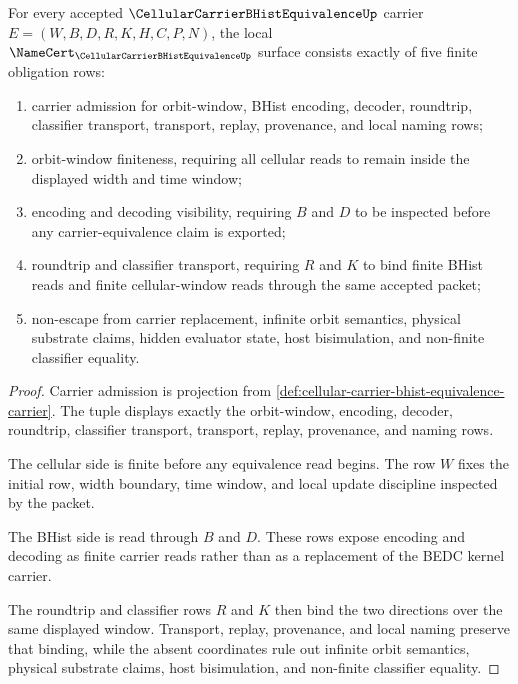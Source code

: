 \begin{theorem}
\label{thm:cellular-carrier-bhist-equivalence-namecert-obligations}
For every accepted $\CellularCarrierBHistEquivalenceUp$ carrier $E=(W,B,D,R,K,H,C,P,N)$, the local $\NameCert_{\CellularCarrierBHistEquivalenceUp}$ surface consists exactly of five finite obligation rows:
\begin{enumerate}
\item carrier admission for orbit-window, BHist encoding, decoder, roundtrip, classifier transport, transport, replay, provenance, and local naming rows;
\item orbit-window finiteness, requiring all cellular reads to remain inside the displayed width and time window;
\item encoding and decoding visibility, requiring $B$ and $D$ to be inspected before any carrier-equivalence claim is exported;
\item roundtrip and classifier transport, requiring $R$ and $K$ to bind finite BHist reads and finite cellular-window reads through the same accepted packet;
\item non-escape from carrier replacement, infinite orbit semantics, physical substrate claims, hidden evaluator state, host bisimulation, and non-finite classifier equality.
\end{enumerate}
\end{theorem}
\begin{proof}
Carrier admission is projection from \autoref{def:cellular-carrier-bhist-equivalence-carrier}. The tuple displays exactly the orbit-window, encoding, decoder, roundtrip, classifier transport, transport, replay, provenance, and naming rows.

The cellular side is finite before any equivalence read begins. The row $W$ fixes the initial row, width boundary, time window, and local update discipline inspected by the packet.

The BHist side is read through $B$ and $D$. These rows expose encoding and decoding as finite carrier reads rather than as a replacement of the BEDC kernel carrier.

The roundtrip and classifier rows $R$ and $K$ then bind the two directions over the same displayed window. Transport, replay, provenance, and local naming preserve that binding, while the absent coordinates rule out infinite orbit semantics, physical substrate claims, host bisimulation, and non-finite classifier equality.
\end{proof}

